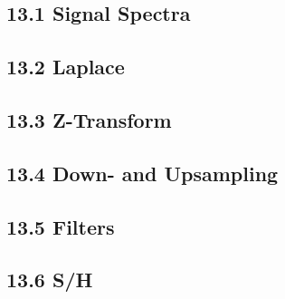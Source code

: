 \subsection{13.1 Signal Spectra}
\subsection{13.2 Laplace}
\subsection{13.3 Z-Transform}
\subsection{13.4 Down- and Upsampling}
\subsection{13.5 Filters}
\subsection{13.6 S/H}
